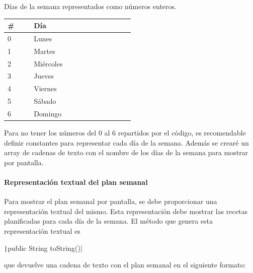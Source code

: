 \documentclass[
    a4paper, %
    12pt, %
]{CSSullivanBusinessReport}
\begin{document}
\begin{margintable}
    \footnotesize
    \caption{Días de la semana representados como números enteros.}\label{tab:int-semana}
    \begin{tabular}{C{0.1\linewidth} L{0.4\linewidth}}
        \toprule
        \textbf{\#} & \textbf{Día}\\
         & Lunes\\
        1 & Martes\\
        2 & Miércoles\\
        3 & Jueves\\
        4 & Viernes\\
        5 & Sábado\\
        6 & Domingo\\
        \bottomrule
    \end{tabular}
\end{margintable}

Para no tener los números del 0 al 6 repartidos por el código, es recomendable definir constantes para representar cada día de la semana. Además se crearé un array de cadenas de texto con el nombre de los días de la semana para mostrar por pantalla.

\paragraph{Representación textual del plan semanal}

Para mostrar el plan semanal por pantalla, se debe proporcionar una representación textual del mismo. Esta representación debe mostrar las recetas planificadas para cada día de la semana. El método que genera esta representación textual es

\texttt|public String toString()|

que devuelve una cadena de texto con el plan semanal en el siguiente formato:

\begin{fullwidth}
\end{fullwidth}
\end{document}
